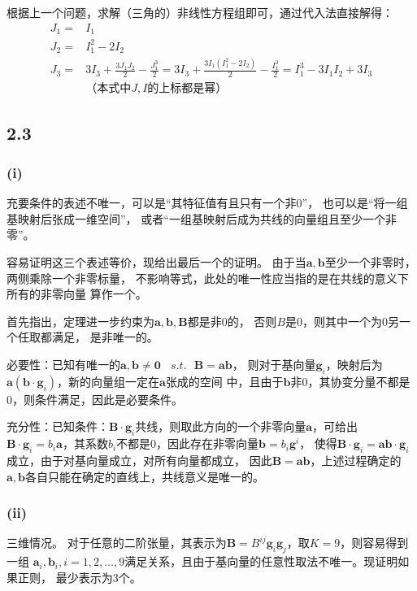 \documentclass[UTF8,zihao=5]{ctexart}
\newcommand{\bm}[1]{{\mathbf{#1}}}
\begin{document}
根据上一个问题，求解（三角的）非线性方程组即可，通过代入法直接解得：
\begin{equation}
    \begin{aligned}
        J_1=&I_1\\
        J_2=&I_1^2-2I_2\\
        J_3=&3I_3+\frac{3J_1J_2}{2}-\frac{J_1^3}{2}
           =3I_3+\frac{3I_1(I_1^2-2I_2)}{2}-\frac{I_1^3}{2}
           =I_1^3-3I_1I_2+3I_3\\
           &\text{（本式中$J,I$的上标都是幂）}
    \end{aligned}
\end{equation}

\subsection*{2.3}
\subsubsection*{(i)}
充要条件的表述不唯一，可以是“其特征值有且只有一个非0”，
也可以是“将一组基映射后张成一维空间”，
或者“一组基映射后成为共线的向量组且至少一个非零”。

容易证明这三个表述等价，现给出最后一个的证明。
由于当$\bm{a},\bm{b}$至少一个非零时，两侧乘除一个非零标量，
不影响等式，此处的唯一性应当指的是在共线的意义下所有的非零向量
算作一个。

首先指出，定理进一步约束为$\bm{a},\bm{b},\bm{B}$都是非0的，
否则$B$是0，则其中一个为0另一个任取都满足，
是非唯一的。

必要性：已知有唯一的$\bm{a},\bm{b}\neq\bm{0}\ \ \ \ s.t.\ \ \  \bm{B}=\bm{a}\bm{b}$，
则对于基向量$\bm{g}_i$，映射后为$\bm{a}(\bm{b}\cdot \bm{g}_i)$，新的向量组一定在$\bm{a}$张成的空间
中，且由于$\bm{b}$非0，其协变分量不都是0，则条件满足，因此是必要条件。

充分性：已知条件：$\bm{B}\cdot\bm{g}_i$共线，则取此方向的一个非零向量$\bm{a}$，可给出
$\bm{B}\cdot\bm{g}_i=b_i\bm{a}$，其系数$b_i$不都是0，因此存在非零向量$\bm{b}=b_i\bm{g}^i$，
使得$\bm{B}\cdot\bm{g}_i=\bm{a}\bm{b}\cdot\bm{g}_i$成立，由于对基向量成立，对所有向量都成立，
因此$\bm{B}=\bm{a}\bm{b}$，上述过程确定的$\bm{a}, \bm{b}$各自只能在确定的直线上，共线意义是唯一的。

\subsubsection*{(ii)}

三维情况。
对于任意的二阶张量，其表示为$\bm{B}=B^{ij}\bm{g}_i\bm{g}_j$，取$K=9$，则容易得到一组
$\bm{a}_i,\bm{b}_i, i=1,2,\dots,9$满足关系，且由于基向量的任意性取法不唯一。现证明如果正则，
最少表示为3个。
\end{document}

